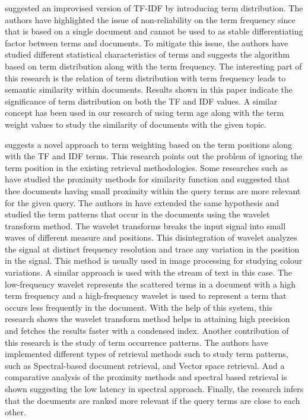     \cite{tian2010improvement} suggested an improvised version of TF-IDF by introducing term distribution. The authors have highlighted the issue of non-reliability on the term frequency since that is based on a single document and cannot be used to as stable differentiating factor between terms and documents.
    To mitigate this issue, the authors have studied different statistical characteristics of terms and suggests the algorithm based on term distribution along with the term frequency. The interesting part of this research is the relation of term distribution with term frequency leads to semantic similarity within documents. Results shown in this paper indicate the significance of term distribution on both the TF and IDF values.
    A similar concept has been used in our research of using term age along with the term weight values to study the similarity of documents with the given topic.


	\cite{RN26} suggests a novel approach to term weighting based on the term positions along with the TF and IDF terms. This research points out the problem of ignoring the term position in the existing retrieval methodologies. Some researches such as  \cite{clarke2000question} have studied the proximity methods for similarity function and suggested that thee documents having small proximity within the query terms are more relevant for the given query. The authors in  \cite{RN26} have extended the same hypothesis and studied the term patterns that occur in the documents using the wavelet transform method. The wavelet transforms breaks the input signal into small waves of different measure and positions. This disintegration of wavelet analyzes the signal at distinct frequency resolution and trace any variation in the position in the signal. This method is usually used in image processing for studying colour variations. A similar approach is used with the stream of text in this case. The low-frequency wavelet represents the scattered terms in a document with a high term frequency and a high-frequency wavelet is used to represent a term that occurs less frequently in the document. With the help of this system, this research shows the wavelet transform method helps in attaining high precision and fetches the results faster with a condensed index. 
	Another contribution of this research is the study of term occurrence patterns. The authors have implemented different types of retrieval methods such to study term patterns, such as Spectral-based document retrieval, and Vector space retrieval. And a comparative analysis of the proximity methods and spectral based retrieval is shown suggesting the low latency in spectral approach. Finally, the research infers that the documents are ranked more relevant if the query terms are close to each other.
	
